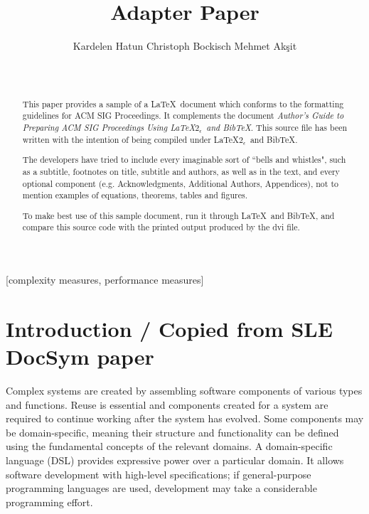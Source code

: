 \documentclass{acm_proc_article-sp}
\begin{document}
\title{Adapter Paper}

\author{
\alignauthor
Kardelen Hatun \hspace{2cm} Christoph Bockisch \hspace{2cm} Mehmet Ak\c{s}it\\
\\
\\
}
\maketitle

\begin{abstract}
This paper provides a sample of a \LaTeX\ document which conforms to
the formatting guidelines for ACM SIG Proceedings.
It complements the document \textit{Author's Guide to Preparing
ACM SIG Proceedings Using \LaTeX$2_\epsilon$\ and Bib\TeX}. This
source file has been written with the intention of being
compiled under \LaTeX$2_\epsilon$\ and BibTeX.

The developers have tried to include every imaginable sort
of ``bells and whistles", such as a subtitle, footnotes on
title, subtitle and authors, as well as in the text, and
every optional component (e.g. Acknowledgments, Additional
Authors, Appendices), not to mention examples of
equations, theorems, tables and figures.

To make best use of this sample document, run it through \LaTeX\
and BibTeX, and compare this source code with the printed
output produced by the dvi file.
\end{abstract}

[complexity measures, performance measures]




\section{Introduction / Copied from SLE DocSym paper}
Complex systems are created by assembling software components of various types
and functions. Reuse is essential and
components created for a system are required to continue working after the system has
evolved. Some components may be
domain-specific, meaning their structure and functionality can be defined using
the fundamental concepts of the relevant domains. A domain-specific language
(DSL) provides expressive power over a particular domain. It allows software
development with high-level specifications; if general-purpose programming languages
are used, development may take a considerable programming effort. 
\end{document}
